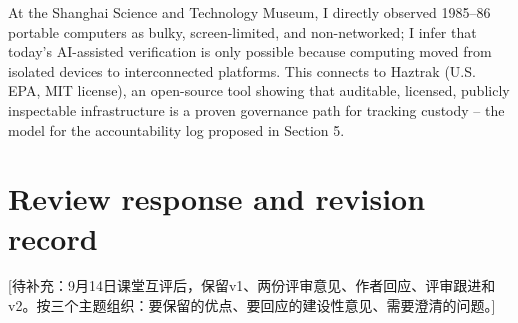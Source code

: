 At the Shanghai Science and Technology Museum, I directly observed 1985--86 portable computers as bulky, screen-limited, and non-networked; I infer that today's AI-assisted verification is only possible because computing moved from isolated devices to interconnected platforms. This connects to Haztrak (U.S. EPA, MIT license), an open-source tool showing that auditable, licensed, publicly inspectable infrastructure is a proven governance path for tracking custody -- the model for the accountability log proposed in Section 5.

\section{Review response and revision record}
[待补充：9月14日课堂互评后，保留v1、两份评审意见、作者回应、评审跟进和v2。按三个主题组织：要保留的优点、要回应的建设性意见、需要澄清的问题。]

\clearpage\onecolumn
